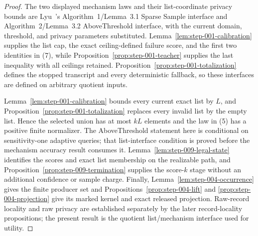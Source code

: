 \begin{proof}
The two displayed mechanism laws and their list-coordinate privacy bounds
are Lyu~\citep{lyu2025}'s Algorithm~1/Lemma~3.1 Sparse Sample interface and
Algorithm~2/Lemma~3.2 AboveThreshold interface, with the current domain,
threshold, and privacy parameters substituted.
Lemma~\ref{lem:step-001-calibration} supplies the list cap, the exact
ceiling-defined failure score, and the first two identities in (7), while
Proposition~\ref{prop:step-001-teacher} supplies the last inequality with
all ceilings retained.  Proposition~\ref{prop:step-001-totalization}
defines the stopped transcript and every deterministic fallback, so these
interfaces are defined on arbitrary quotient inputs.

Lemma~\ref{lem:step-001-calibration} bounds every current exact list by
$L$, and Proposition~\ref{prop:step-001-totalization} replaces every
invalid list by the empty list. Hence the selected union has at most
$kL$ elements and the law in (5) has a positive finite normalizer. The
AboveThreshold statement here is conditional on sensitivity-one adaptive
queries; that list-interface condition is proved before the mechanism
accuracy result consumes it. Lemma~\ref{lem:step-009-legal-state}
identifies the scores and exact list membership on the realizable path, and
Proposition~\ref{prop:step-009-termination} supplies the score-\(k\) stage
without an additional confidence or sample charge.  Finally,
Lemma~\ref{lem:step-004-occurrence} gives the finite producer set and
Propositions~\ref{prop:step-004-lift} and
\ref{prop:step-004-projection} give its marked kernel and exact released
projection.  Raw-record locality and raw privacy are established separately
by the later record-locality propositions; the present result is the
quotient list/mechanism interface used for utility.
\end{proof}



